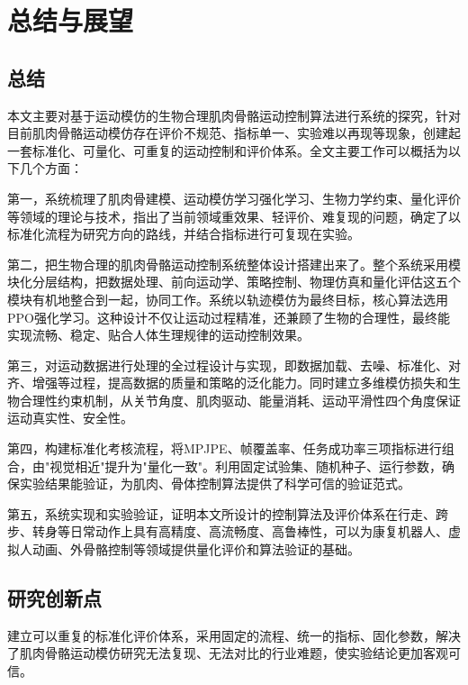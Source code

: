 
\chapter{总结与展望}\label{ux603bux7ed3ux4e0eux5c55ux671b}

\section{总结}\label{ux603bux7ed3}

本文主要对基于运动模仿的生物合理肌肉骨骼运动控制算法进行系统的探究，针对目前肌肉骨骼运动模仿存在评价不规范、指标单一、实验难以再现等现象，创建起一套标准化、可量化、可重复的运动控制和评价体系。全文主要工作可以概括为以下几个方面：

第一，系统梳理了肌肉骨建模、运动模仿学习强化学习、生物力学约束、量化评价等领域的理论与技术，指出了当前领域重效果、轻评价、难复现的问题，确定了以标准化流程为研究方向的路线，并结合指标进行可复现在实验。

第二，把生物合理的肌肉骨骼运动控制系统整体设计搭建出来了。整个系统采用模块化分层结构，把数据处理、前向运动学、策略控制、物理仿真和量化评估这五个模块有机地整合到一起，协同工作。系统以轨迹模仿为最终目标，核心算法选用PPO强化学习。这种设计不仅让运动过程精准，还兼顾了生物的合理性，最终能实现流畅、稳定、贴合人体生理规律的运动控制效果。

第三，对运动数据进行处理的全过程设计与实现，即数据加载、去噪、标准化、对齐、增强等过程，提高数据的质量和策略的泛化能力。同时建立多维模仿损失和生物合理性约束机制，从关节角度、肌肉驱动、能量消耗、运动平滑性四个角度保证运动真实性、安全性。

第四，构建标准化考核流程，将MPJPE、帧覆盖率、任务成功率三项指标进行组合，由"视觉相近"提升为"量化一致"。利用固定试验集、随机种子、运行参数，确保实验结果能验证，为肌肉、骨体控制算法提供了科学可信的验证范式。

第五，系统实现和实验验证，证明本文所设计的控制算法及评价体系在行走、跨步、转身等日常动作上具有高精度、高流畅度、高鲁棒性，可以为康复机器人、虚拟人动画、外骨骼控制等领域提供量化评价和算法验证的基础。

\section{研究创新点}\label{ux7814ux7a76ux521bux65b0ux70b9}

建立可以重复的标准化评价体系，采用固定的流程、统一的指标、固化参数，解决了肌肉骨骼运动模仿研究无法复现、无法对比的行业难题，使实验结论更加客观可信。


